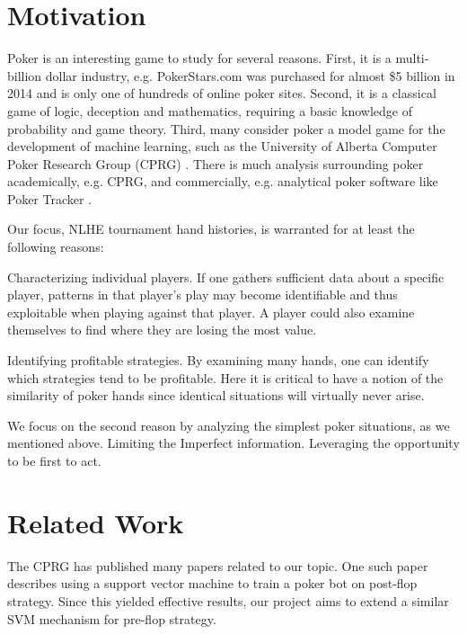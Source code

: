 \documentclass[twoside]{article}
\begin{document}
\begin{multicols}{2}


\section{Motivation}

Poker is an interesting game to study for several reasons. First, it is a multi-billion dollar industry, e.g. PokerStars.com was purchased for almost \$5 billion in 2014 \cite{PokerStarsAcquired} and is only one of hundreds of online poker sites. Second, it is a classical game of logic, deception and mathematics, requiring a basic knowledge of probability and game theory. Third, many consider poker a model game for the development of machine learning, such as the University of Alberta Computer Poker Research Group (CPRG) \cite{SVMPoker}. There is much analysis surrounding poker academically, e.g. CPRG, and commercially, e.g. analytical poker software like Poker Tracker \cite{PokerTracker}.

Our focus, NLHE tournament hand histories, is warranted for at least the following reasons:

\begin{compactitem}
	\item Characterizing individual players. If one gathers sufficient data about a specific player, patterns in that player's play may become identifiable and thus exploitable when playing against that player. A player could also examine themselves to find where they are losing the most value.
	\item Identifying profitable strategies. By examining many hands, one can identify which strategies tend to be profitable. Here it is critical to have a notion of the similarity of poker hands since identical situations will virtually never arise.
\end{compactitem}

We focus on the second reason by analyzing the simplest poker situations, as we mentioned above. 
Limiting the Imperfect information.
Leveraging the opportunity to be first to act. 


\section{Related Work}

The CPRG has published many papers related to our topic.
One such paper \cite{SVMPoker} describes using a support vector machine to train a poker bot on post-flop strategy. Since this yielded effective results, our project aims to extend a similar SVM mechanism for pre-flop strategy.


\end{multicols}
\end{document}
